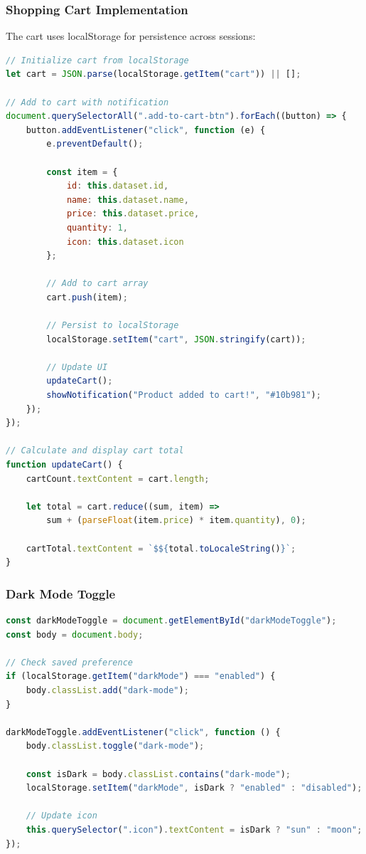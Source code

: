 \documentclass[12pt,a4paper]{article}
\begin{document}
\subsubsection{Shopping Cart Implementation}

The cart uses localStorage for persistence across sessions:

\begin{lstlisting}[language=JavaScript, caption=Shopping Cart Logic]
// Initialize cart from localStorage
let cart = JSON.parse(localStorage.getItem("cart")) || [];

// Add to cart with notification
document.querySelectorAll(".add-to-cart-btn").forEach((button) => {
    button.addEventListener("click", function (e) {
        e.preventDefault();
        
        const item = {
            id: this.dataset.id,
            name: this.dataset.name,
            price: this.dataset.price,
            quantity: 1,
            icon: this.dataset.icon
        };
        
        // Add to cart array
        cart.push(item);
        
        // Persist to localStorage
        localStorage.setItem("cart", JSON.stringify(cart));
        
        // Update UI
        updateCart();
        showNotification("Product added to cart!", "#10b981");
    });
});

// Calculate and display cart total
function updateCart() {
    cartCount.textContent = cart.length;
    
    let total = cart.reduce((sum, item) => 
        sum + (parseFloat(item.price) * item.quantity), 0);
    
    cartTotal.textContent = `$${total.toLocaleString()}`;
}
\end{lstlisting}

\subsubsection{Dark Mode Toggle}

\begin{lstlisting}[language=JavaScript, caption=Dark Mode Implementation]
const darkModeToggle = document.getElementById("darkModeToggle");
const body = document.body;

// Check saved preference
if (localStorage.getItem("darkMode") === "enabled") {
    body.classList.add("dark-mode");
}

darkModeToggle.addEventListener("click", function () {
    body.classList.toggle("dark-mode");
    
    const isDark = body.classList.contains("dark-mode");
    localStorage.setItem("darkMode", isDark ? "enabled" : "disabled");
    
    // Update icon
    this.querySelector(".icon").textContent = isDark ? "sun" : "moon";
});
\end{lstlisting}
\end{document}
